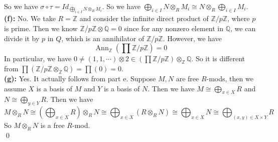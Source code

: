 \documentclass[12pt]{amsart}
\newcommand{\Q}{\mathbb{Q}}
\newcommand{\Z}{\mathbb{Z}}
\newcommand{\Ann}[0]{\operatorname{Ann}}
\begin{document}
So we have $\sigma\circ \tau= Id_{\bigoplus_{i\in I} N\otimes_R M_i }$. So we have $\bigoplus_{i\in I} N\otimes_R M_i\cong  N\otimes_R \bigoplus_{i\in I}M_i$.
\\\textbf{(f):} No. We take $R=\Z$ and consider the infinite direct product of $\Z/p\Z$, where $p$ is prime. Then we know $\Z/p\Z \otimes \Q=0$ since for any nonzero element in $\Q$, we can divide it by $p$ in $Q$, which is an annihilator of $\Z/p\Z$. However, we have
\[\Ann_\Z(\prod \Z/p\Z)=0\]
In particular, we have $0\neq (1,1,\cdots)\otimes 2\in(\prod\Z/p\Z)\otimes_\Z\Q$. So it is different from $\prod(\Z/p\Z\otimes_\Z\Q)=\prod(0)=0$.\\
\textbf{(g):} Yes. It actually follows from part e. Suppose $M,N$ are free $R$-mods, then we assume $X$ is a basis of $M$ and $Y$ is a basis of $N$. Then we have $M\cong \bigoplus_{x\in X}R$ and $N\cong \bigoplus_{y\in Y}R$. Then we have
\[M\otimes_R N\cong (\bigoplus_{x\in X}R)\otimes_R N\cong \bigoplus_{x\in X}(R\otimes_R N)\cong \bigoplus_{x\in X}N\cong \bigoplus_{(x,y)\in X\times Y}R  \]
So $M\otimes_R N$ is a free $R$-mod.\\
\qed\\
\end{document}
